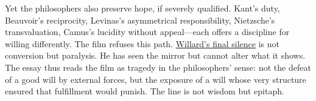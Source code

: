 Yet the philosophers also preserve hope, if severely qualified. Kant's duty, Beauvoir's
reciprocity, Levinas's asymmetrical responsibility, Nietzsche's transvaluation, Camus's
lucidity without appeal---each offers a discipline for willing differently. The film refuses
this path. \hyperref[scene:assassination]{Willard's final silence} is not conversion but
paralysis. He has seen the mirror but
cannot alter what it shows. The essay thus reads the film as tragedy in the philosophers'
sense: not the defeat of a good will by external forces, but the exposure of a will whose very
structure ensured that fulfillment would punish. The line is not wisdom but epitaph.
